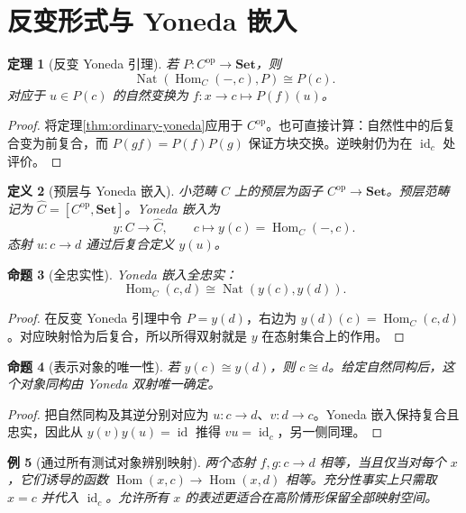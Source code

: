 \documentclass[12pt,oneside,openany,fontset=none]{ctexbook}
\theoremstyle{cn}
\newtheorem{definition}{定义}[chapter]
\newtheorem{example}[definition]{例}
\newtheorem{proposition}[definition]{命题}
\newtheorem{theorem}[definition]{定理}
\numberwithin{equation}{chapter}
\newcommand{\Set}{\mathbf{Set}}
\newcommand{\id}{\operatorname{id}}
\newcommand{\Hom}{\operatorname{Hom}}
\newcommand{\Nat}{\operatorname{Nat}}
\newcommand{\op}{\mathrm{op}}
\begin{document}
\section{反变形式与 Yoneda 嵌入}
\begin{theorem}[反变 Yoneda 引理]
若 $P:C^\op\to\Set$，则
\[
\Nat(\Hom_C(-,c),P)\cong P(c).
\]
对应于 $u\in P(c)$ 的自然变换为 $f:x\to c\mapsto P(f)(u)$。
\end{theorem}
\begin{proof}
将定理\ref{thm:ordinary-yoneda}应用于 $C^\op$。也可直接计算：自然性中的后复合变为前复合，而 $P(gf)=P(f)P(g)$ 保证方块交换。逆映射仍为在 $\id_c$ 处评价。
\end{proof}
\begin{definition}[预层与 Yoneda 嵌入]
小范畴 $C$ 上的预层为函子 $C^\op\to\Set$。预层范畴记为 $\widehat C=[C^\op,\Set]$。Yoneda 嵌入为
\[
y:C\to\widehat C,
\qquad c\mapsto y(c)=\Hom_C(-,c).
\]
态射 $u:c\to d$ 通过后复合定义 $y(u)$。
\end{definition}
\begin{proposition}[全忠实性]
Yoneda 嵌入全忠实：
\[
\Hom_C(c,d)\cong\Nat(y(c),y(d)).
\]
\end{proposition}
\begin{proof}
在反变 Yoneda 引理中令 $P=y(d)$，右边为 $y(d)(c)=\Hom_C(c,d)$。对应映射恰为后复合，所以所得双射就是 $y$ 在态射集合上的作用。
\end{proof}
\begin{proposition}[表示对象的唯一性]
若 $y(c)\cong y(d)$，则 $c\cong d$。给定自然同构后，这个对象同构由 Yoneda 双射唯一确定。
\end{proposition}
\begin{proof}
把自然同构及其逆分别对应为 $u:c\to d$、$v:d\to c$。Yoneda 嵌入保持复合且忠实，因此从 $y(v)y(u)=\id$ 推得 $vu=\id_c$，另一侧同理。
\end{proof}
\begin{example}[通过所有测试对象辨别映射]
两个态射 $f,g:c\to d$ 相等，当且仅当对每个 $x$，它们诱导的函数 $\Hom(x,c)\to\Hom(x,d)$ 相等。充分性事实上只需取 $x=c$ 并代入 $\id_c$。允许所有 $x$ 的表述更适合在高阶情形保留全部映射空间。
\end{example}
\end{document}
